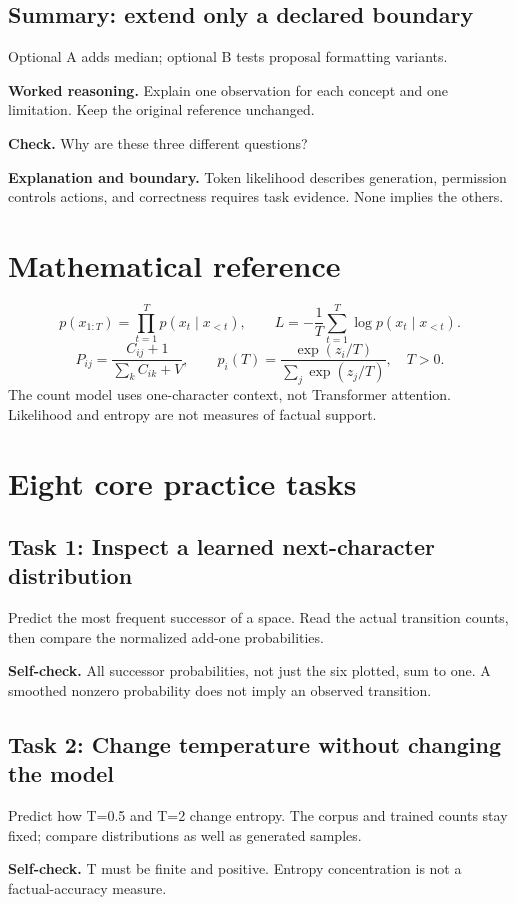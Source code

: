 \subsection{Summary: extend only a declared boundary}
Optional A adds median; optional B tests proposal formatting variants.

\textbf{Worked reasoning.} Explain one observation for each concept and one limitation. Keep the original reference unchanged.

\textbf{Check.} Why are these three different questions?

\textbf{Explanation and boundary.} Token likelihood describes generation, permission controls actions, and correctness requires task evidence. None implies the others.

\section{Mathematical reference}\[p(x_{1:T})=\prod_{t=1}^{T}p(x_t\mid x_{<t}),\qquad L=-\frac1T\sum_{t=1}^{T}\log p(x_t\mid x_{<t}).\]\[P_{ij}=\frac{C_{ij}+1}{\sum_k C_{ik}+V},\qquad p_i(T)=\frac{\exp(z_i/T)}{\sum_j\exp(z_j/T)},\quad T>0.\]The count model uses one-character context, not Transformer attention. Likelihood and entropy are not measures of factual support.
\section{Eight core practice tasks}
\subsection{Task 1: Inspect a learned next-character distribution}
Predict the most frequent successor of a space. Read the actual transition counts, then compare the normalized add-one probabilities.

\textbf{Self-check.} All successor probabilities, not just the six plotted, sum to one. A smoothed nonzero probability does not imply an observed transition.
\subsection{Task 2: Change temperature without changing the model}
Predict how T=0.5 and T=2 change entropy. The corpus and trained counts stay fixed; compare distributions as well as generated samples.

\textbf{Self-check.} T must be finite and positive. Entropy concentration is not a factual-accuracy measure.
